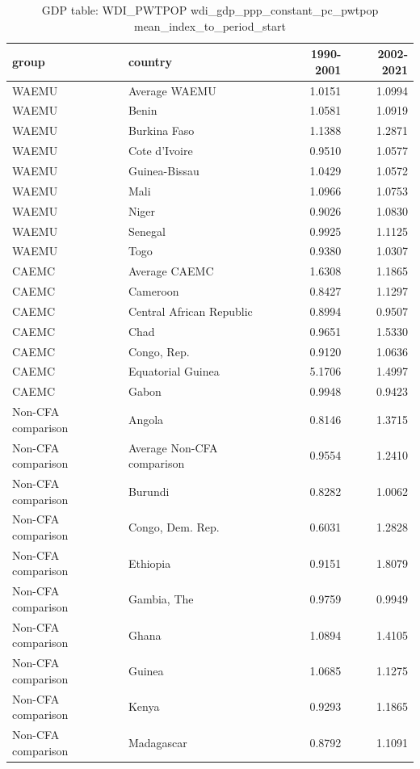 \begin{table}

\caption{GDP table: WDI_PWTPOP wdi_gdp_ppp_constant_pc_pwtpop mean_index_to_period_start}
\centering
\begin{tabular}[t]{llrr}
\toprule
group & country & 1990-2001 & 2002-2021\\
\midrule
WAEMU & Average WAEMU & 1.0151 & 1.0994\\
WAEMU & Benin & 1.0581 & 1.0919\\
WAEMU & Burkina Faso & 1.1388 & 1.2871\\
WAEMU & Cote d'Ivoire & 0.9510 & 1.0577\\
WAEMU & Guinea-Bissau & 1.0429 & 1.0572\\
\addlinespace
WAEMU & Mali & 1.0966 & 1.0753\\
WAEMU & Niger & 0.9026 & 1.0830\\
WAEMU & Senegal & 0.9925 & 1.1125\\
WAEMU & Togo & 0.9380 & 1.0307\\
CAEMC & Average CAEMC & 1.6308 & 1.1865\\
\addlinespace
CAEMC & Cameroon & 0.8427 & 1.1297\\
CAEMC & Central African Republic & 0.8994 & 0.9507\\
CAEMC & Chad & 0.9651 & 1.5330\\
CAEMC & Congo, Rep. & 0.9120 & 1.0636\\
CAEMC & Equatorial Guinea & 5.1706 & 1.4997\\
\addlinespace
CAEMC & Gabon & 0.9948 & 0.9423\\
Non-CFA comparison & Angola & 0.8146 & 1.3715\\
Non-CFA comparison & Average Non-CFA comparison & 0.9554 & 1.2410\\
Non-CFA comparison & Burundi & 0.8282 & 1.0062\\
Non-CFA comparison & Congo, Dem. Rep. & 0.6031 & 1.2828\\
\addlinespace
Non-CFA comparison & Ethiopia & 0.9151 & 1.8079\\
Non-CFA comparison & Gambia, The & 0.9759 & 0.9949\\
Non-CFA comparison & Ghana & 1.0894 & 1.4105\\
Non-CFA comparison & Guinea & 1.0685 & 1.1275\\
Non-CFA comparison & Kenya & 0.9293 & 1.1865\\
\addlinespace
Non-CFA comparison & Madagascar & 0.8792 & 1.1091\\

\end{tabular}
\end{table}
